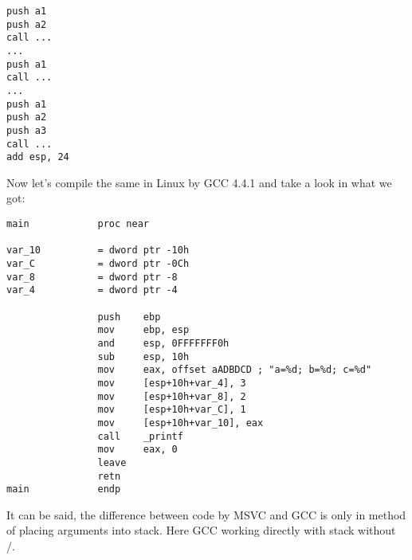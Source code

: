 \begin{lstlisting}
push a1
push a2
call ...
...
push a1
call ...
...
push a1
push a2
push a3
call ...
add esp, 24
\end{lstlisting}

{Now let's compile the same in Linux by GCC 4.4.1 and take a look in \IDA what we got:}

\begin{lstlisting}
main            proc near

var_10          = dword ptr -10h
var_C           = dword ptr -0Ch
var_8           = dword ptr -8
var_4           = dword ptr -4

                push    ebp
                mov     ebp, esp
                and     esp, 0FFFFFFF0h
                sub     esp, 10h
                mov     eax, offset aADBDCD ; "a=%d; b=%d; c=%d"
                mov     [esp+10h+var_4], 3
                mov     [esp+10h+var_8], 2
                mov     [esp+10h+var_C], 1
                mov     [esp+10h+var_10], eax
                call    _printf
                mov     eax, 0
                leave
                retn
main            endp
\end{lstlisting}

{It can be said, the difference between code by MSVC and GCC is only in method of placing arguments into stack. 
Here GCC working directly with stack without \PUSH/\POP.}
